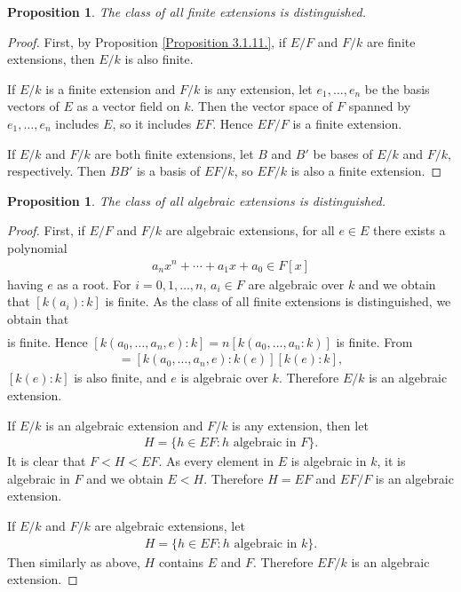 \documentclass[12pt]{report}
\theoremstyle{plain}
\newtheorem{proposition}[theorem]{Proposition}
\theoremstyle{remark}
\theoremstyle{definition}
\begin{document}
\begin{proposition}
    The class of all finite extensions is distinguished.
\end{proposition}
\begin{proof}
    First, by Proposition \ref{Proposition 3.1.11.}, if $E/F$ and $F/k$ are finite extensions, then $E/k$ is also finite.
    
    If $E/k$ is a finite extension and $F/k$ is any extension, let $e_1,\dots,e_n$ be the basis vectors of $E$ as a vector field on $k$. Then the vector space of $F$ spanned by $e_1,\dots,e_n$ includes $E$, so it includes $EF$. Hence $EF/F$ is a finite extension.

    If $E/k$ and $F/k$ are both finite extensions, let $B$ and $B'$ be bases of $E/k$ and $F/k$, respectively. Then $BB'$ is a basis of $EF/k$, so $EF/k$ is also a finite extension.
\end{proof}

\begin{proposition}
    The class of all algebraic extensions is distinguished.
\end{proposition}
\begin{proof}
    First, if $E/F$ and $F/k$ are algebraic extensions, for all $e\in E$ there exists a polynomial
    \begin{align*}
        a_n x^n + \cdots + a_1 x + a_0 \in F[x]
    \end{align*}
    having $e$ as a root. For $i=0,1,\dots,n$, $a_i\in F$ are algebraic over $k$ and we obtain that $[k(a_i):k]$ is finite. As the class of all finite extensions is distinguished, we obtain that
    \begin{align*}
        [k(a_0,\dots,a_n):k]
    \end{align*}
    is finite. Hence $[k(a_0,\dots,a_n,e):k]=n[k(a_0,\dots,a_n:k)]$ is finite. From
    \begin{align*}
        [k(a_0,\dots,a_n,e):k] = [k(a_0,\dots,a_n,e):k(e)][k(e):k],
    \end{align*}
    $[k(e):k]$ is also finite, and $e$ is algebraic over $k$. Therefore $E/k$ is an algebraic extension.

    If $E/k$ is an algebraic extension and $F/k$ is any extension, then let
    \begin{align*}
        H=\{h\in EF:h\text{~algebraic~in~}F\}.
    \end{align*}
    It is clear that $F<H<EF$. As every element in $E$ is algebraic in $k$, it is algebraic in $F$ and we obtain $E<H$. Therefore $H=EF$ and $EF/F$ is an algebraic extension.

    If $E/k$ and $F/k$ are algebraic extensions, let
    \begin{align*}
        H=\{h\in EF:h\text{~algebraic~in~}k\}.
    \end{align*}
    Then similarly as above, $H$ contains $E$ and $F$. Therefore $EF/k$ is an algebraic extension.
\end{proof}
\end{document}
